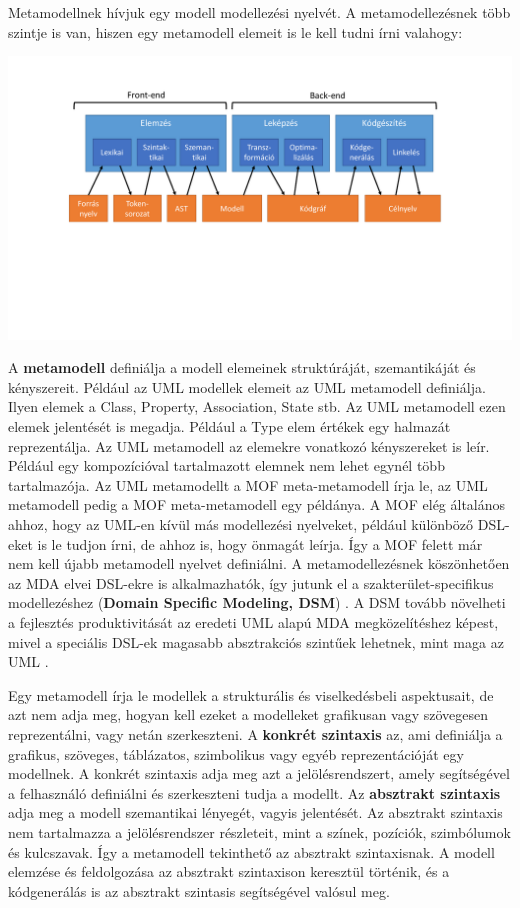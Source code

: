 \documentclass[12pt, a4paper]{report}
\newcommand{\bb}[1]{\textbf{#1}}
\begin{document}
Metamodellnek hívjuk egy modell modellezési nyelvét. A metamodellezésnek több szintje is van, hiszen egy metamodell elemeit is le kell tudni írni valahogy:

\begin{center}\includegraphics[trim=0 0 0 0,clip,width=\textwidth,page=13]{Images.pdf}\end{center}

A \bb{metamodell} definiálja a modell elemeinek struktúráját, szemantikáját és kényszereit. Például az UML modellek elemeit az UML metamodell definiálja. Ilyen elemek a Class, Property, Association, State stb. Az UML metamodell ezen elemek jelentését is megadja. Például a Type elem értékek egy halmazát reprezentálja. Az UML metamodell az elemekre vonatkozó kényszereket is leír. Például egy kompozícióval tartalmazott elemnek nem lehet egynél több tartalmazója. Az UML metamodellt a MOF meta-metamodell írja le, az UML metamodell pedig a MOF meta-metamodell egy példánya. A MOF elég általános ahhoz, hogy az UML-en kívül más modellezési nyelveket, például különböző DSL-eket is le tudjon írni, de ahhoz is, hogy önmagát leírja. Így a MOF felett már nem kell újabb metamodell nyelvet definiálni. A metamodellezésnek köszönhetően az MDA elvei DSL-ekre is alkalmazhatók, így jutunk el a szakterület-specifikus modellezéshez (\bb{Domain Specific Modeling, DSM}) \cite{Kel08}. A DSM tovább növelheti a fejlesztés produktivitását az eredeti UML alapú MDA megközelítéshez képest, mivel a speciális DSL-ek magasabb absztrakciós szintűek lehetnek, mint maga az UML \cite{Ste09} \cite{Met18}.

Egy metamodell írja le modellek a strukturális és viselkedésbeli aspektusait, de azt nem adja meg, hogyan kell ezeket a modelleket grafikusan vagy szövegesen reprezentálni, vagy netán szerkeszteni. A \bb{konkrét szintaxis} az, ami definiálja a grafikus, szöveges, táblázatos, szimbolikus vagy egyéb reprezentációját egy modellnek. A konkrét szintaxis adja meg azt a jelölésrendszert, amely segítségével a felhasználó definiálni és szerkeszteni tudja a modellt. Az \bb{absztrakt szintaxis} adja meg a modell szemantikai lényegét, vagyis jelentését. Az absztrakt szintaxis nem tartalmazza a jelölésrendszer részleteit, mint a színek, pozíciók, szimbólumok és kulcszavak. Így a metamodell tekinthető az absztrakt szintaxisnak. A modell elemzése és feldolgozása az absztrakt szintaxison keresztül történik, és a kódgenerálás is az absztrakt szintasis segítségével valósul meg.
\end{document}
